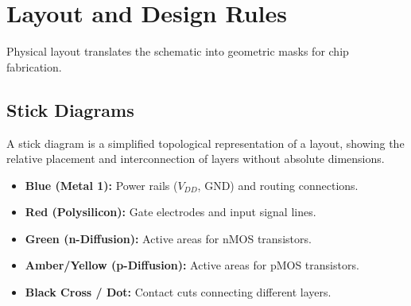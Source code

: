 \documentclass[12pt,a4paper]{article}
\begin{document}
\section{Layout and Design Rules}

Physical layout translates the schematic into geometric masks for chip fabrication.

\subsection{Stick Diagrams}
A stick diagram is a simplified topological representation of a layout, showing the relative placement and interconnection of layers without absolute dimensions.

\begin{tcolorbox}[defbox, title={\textbf{Stick Diagram Color Codes}}]
\begin{itemize}[leftmargin=*, itemsep=2.5pt, topsep=0pt]
  \item \textbf{\color{myteal}Blue (Metal 1):} Power rails ($V_{DD}$, GND) and routing connections.
  \item \textbf{\color{myred}Red (Polysilicon):} Gate electrodes and input signal lines.
  \item \textbf{\color{mygreen}Green (n-Diffusion):} Active areas for nMOS transistors.
  \item \textbf{\color{myamber}Amber/Yellow (p-Diffusion):} Active areas for pMOS transistors.
  \item \textbf{Black Cross / Dot:} Contact cuts connecting different layers.
\end{itemize}
\end{tcolorbox}
\end{document}
